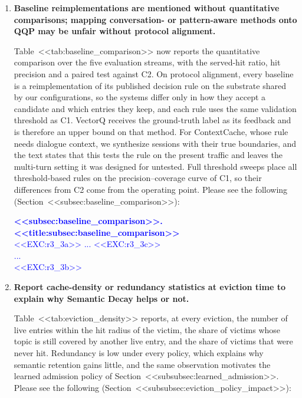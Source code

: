 \documentclass[11pt]{article}
\begin{document}
\begin{enumerate}[leftmargin=*, itemsep=1.2em]
\textcolor{blue}{\textbf{<<subsubsec:eviction_policy_impact>>. <<title:subsubsec:eviction_policy_impact>>}\\
...\\
<<EXC:r3_2a>>\\
...\\
\textbf{<<subsubsec:learned_admission>>. <<title:subsubsec:learned_admission>>}\\
...\\
<<EXC:r3_2b>>\\
...\\
<<EXC:r3_2c>>}

\item \textbf{Baseline reimplementations are mentioned without quantitative comparisons; mapping conversation- or pattern-aware methods onto QQP may be unfair without protocol alignment.}

Table~<<tab:baseline_comparison>> now reports the quantitative comparison over the five evaluation streams, with the served-hit ratio, hit precision and a paired test against C2. On protocol alignment, every baseline is a reimplementation of its published decision rule on the substrate shared by our configurations, so the systems differ only in how they accept a candidate and which entries they keep, and each rule uses the same validation threshold as C1. VectorQ receives the ground-truth label as its feedback and is therefore an upper bound on that method. For ContextCache, whose rule needs dialogue context, we synthesize sessions with their true boundaries, and the text states that this tests the rule on the present traffic and leaves the multi-turn setting it was designed for untested. Full threshold sweeps place all threshold-based rules on the precision--coverage curve of C1, so their differences from C2 come from the operating point. Please see the following (Section~<<subsec:baseline_comparison>>):

\textcolor{blue}{\textbf{<<subsec:baseline_comparison>>. <<title:subsec:baseline_comparison>>}\\
<<EXC:r3_3a>> ... <<EXC:r3_3c>>\\
...\\
<<EXC:r3_3b>>}

\item \textbf{Report cache-density or redundancy statistics at eviction time to explain why Semantic Decay helps or not.}

Table~<<tab:eviction_density>> reports, at every eviction, the number of live entries within the hit radius of the victim, the share of victims whose topic is still covered by another live entry, and the share of victims that were never hit. Redundancy is low under every policy, which explains why semantic retention gains little, and the same observation motivates the learned admission policy of Section~<<subsubsec:learned_admission>>. Please see the following (Section~<<subsubsec:eviction_policy_impact>>):


\end{enumerate}
\end{document}
